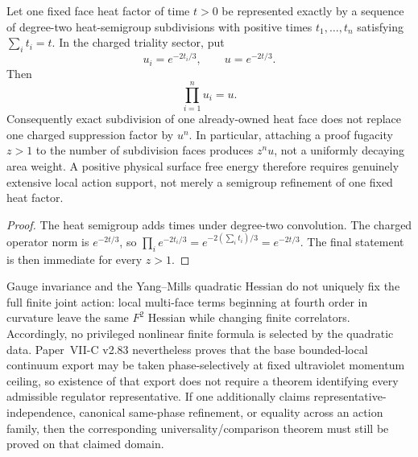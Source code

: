 \documentclass[12pt,a4paper]{article}
\begin{document}
\begin{proposition}
\label{p10:prop:v2158-heat-subdivision-area-nogo}
Let one fixed face heat factor of time $t>0$ be represented exactly by a
sequence of degree-two heat-semigroup subdivisions with positive times
$t_1,\ldots,t_n$ satisfying $\sum_i t_i=t$.  In the charged triality sector,
put
\[
 u_i=e^{-2t_i/3},\qquad u=e^{-2t/3}.
\]
Then
\[
 \boxed{\prod_{i=1}^n u_i=u.}
\]
Consequently exact subdivision of one already-owned heat face does not replace
one charged suppression factor by $u^n$.  In particular, attaching a proof
fugacity $z>1$ to the number of subdivision faces produces $z^n u$, not a
uniformly decaying area weight.  A positive physical surface free energy
therefore requires genuinely extensive local action support, not merely a
semigroup refinement of one fixed heat factor.
\end{proposition}
\begin{proof}
The heat semigroup adds times under degree-two convolution.  The charged
operator norm is $e^{-2t/3}$, so
$\prod_i e^{-2t_i/3}=e^{-2(\sum_i t_i)/3}=e^{-2t/3}$.  The final statement is
then immediate for every $z>1$.
\end{proof}

\begin{proposition}
\label{p10:prop:finite-action-universality-status}
Gauge invariance and the Yang--Mills quadratic Hessian do not uniquely fix the
full finite joint action: local multi-face terms beginning at fourth order in
curvature leave the same $F^2$ Hessian while changing finite correlators.
Accordingly, no privileged nonlinear finite formula is selected by the quadratic data.  Paper~VII-C v2.83 nevertheless proves that the base bounded-local continuum export may be taken phase-selectively at fixed ultraviolet momentum ceiling, so existence of that export does not require a theorem identifying every admissible regulator representative.  If one additionally claims representative-independence, canonical same-phase refinement, or equality across an action family, then the corresponding universality/comparison theorem must still be proved on that claimed domain.
\end{proposition}
\end{document}
